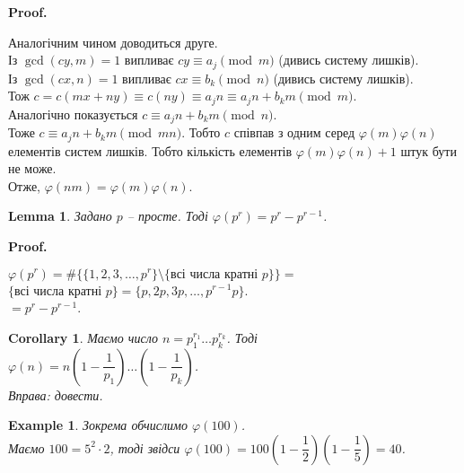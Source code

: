 \documentclass[a4paper, 14pt]{extarticle}
\makeatletter
\theoremstyle{theoremdd}
\theoremstyle{theoremdd}
\theoremstyle{theoremdd}
\theoremstyle{theoremdd}
\newtheorem{example}[theorem]{Example}
\theoremstyle{theoremdd}
\theoremstyle{theoremdd}
\theoremstyle{theoremdd}
\newtheorem{lemma}[theorem]{Lemma}
\theoremstyle{theoremdd}
\newtheorem{corollary}[theorem]{Corollary}
\def\qed{$\blacksquare$}
\renewenvironment{proof}[1][Proof.\\]{\par
\pushQED{\hfill \qed}%
\normalfont \topsep6\p@\@plus6\p@\relax
\trivlist
\item\relax
{\bfseries
#1\@addpunct{.}}\hspace\labelsep\ignorespaces
}{%
\popQED\endtrivlist\@endpefalse
}
\makeatother
\begin{document}
\begin{proof}
Аналогічним чином доводиться друге.\\
Із $\gcd(cy,m) = 1$ випливає $cy \equiv a_j \pmod m$ (дивись систему лишків).\\
Із $\gcd(cx,n) = 1$ випливає $cx \equiv b_k \pmod n$ (дивись систему лишків).\\
Тож $c = c(mx+ny) \equiv c(ny) \equiv a_j n \equiv a_jn + b_km \pmod m$.\\
Аналогічно показується $c \equiv a_jn+b_km \pmod n$.\\
Тоже $c \equiv a_j n + b_k m \pmod {mn}$. Тобто $c$ співпав з одним серед $\varphi(m)\varphi(n)$ елементів систем лишків. Тобто кількість елементів $\varphi(m)\varphi(n) + 1$ штук бути не може.\\
Отже, $\varphi(nm) = \varphi(m) \varphi(n)$.
\end{proof}

\begin{lemma}
Задано $p$ -- просте. Тоді $\varphi(p^r) = p^r - p^{r-1}$.
\end{lemma}

\begin{proof}
$\varphi(p^r) = \# \{ \{1,2,3,\dots,p^r\} \setminus \{ \text{всі числа кратні }p \} \} \boxed{=}$\\
$\{\text{всі числа кратні }p\} = \{p,2p,3p,\dots,p^{r-1}p\}$.\\
$\boxed{=} p^r - p^{r-1}$.
\end{proof}

\begin{corollary}
Маємо число $n = p_1^{r_1} \dots p_k^{r_k}$. Тоді\\
$\varphi(n) = n \left( 1 - \dfrac{1}{p_1} \right) \dots \left( 1 - \dfrac{1}{p_k} \right)$.\\
\textit{Вправа: довести.}
\end{corollary}

\begin{example}
Зокрема обчислимо $\varphi(100)$.\\
Маємо $100 = 5^2 \cdot 2$, тоді звідси $\varphi(100) = 100 \left( 1 - \dfrac{1}{2} \right) \left( 1 - \dfrac{1}{5} \right) = 40$.
\end{example}
\end{document}
